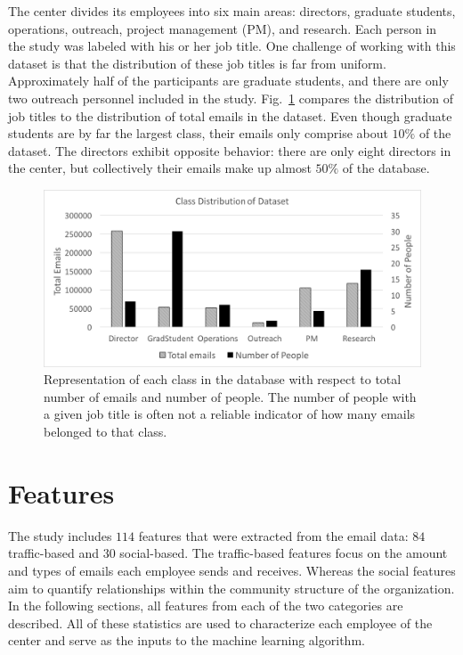 \documentclass[10pt,twocolumn,conference]{IEEEtran}
\begin{document}
The center divides its employees into six main areas: directors, graduate students, operations, outreach, project management (PM), and research.
Each person in the study was labeled with his or her job title.
One challenge of working with this dataset is that the distribution of these job titles is far from uniform.
Approximately half of the participants are graduate students, and there are only two outreach personnel included in the study.
Fig.~\ref{fig:db_bar} compares the distribution of job titles to the distribution of total emails in the dataset.
Even though graduate students are by far the largest class, their emails only comprise about $10\%$ of the dataset.
The directors exhibit opposite behavior: there are only eight directors in the center, but collectively their emails make up almost $50\%$ of the database.

\begin{figure}[t]
	\centering
	\includegraphics[width=\columnwidth,trim={1mm 5mm 1mm 5mm},clip]{DatasetStatsBar_BW}
    \vspace{-17pt}
	\caption{Representation of each class in the database with respect to total number of emails and number of people.  The number of people with a given job title is often not a reliable indicator of how many emails belonged to that class.}
	\vspace{-15pt}
	\label{fig:db_bar}
\end{figure}


\section{Features} \label{Features}
The study includes $114$ features that were extracted from the email data: $84$ traffic-based and $30$ social-based.
The traffic-based features focus on the amount and types of emails each employee sends and receives.
Whereas the social features aim to quantify relationships within the community structure of the organization.
In the following sections, all features from each of the two categories are described. 
All of these statistics are used to characterize each employee of the center and serve as the inputs to the machine learning algorithm.
\end{document}
